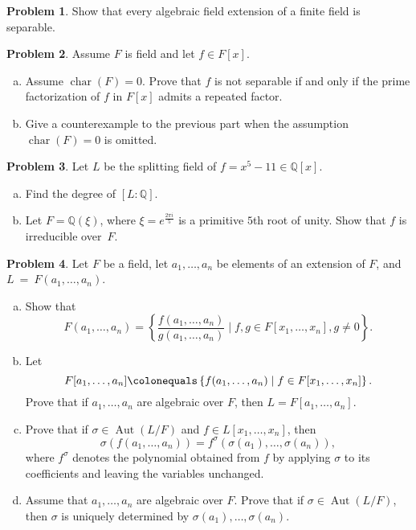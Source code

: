 \documentclass[11pt]{article}
\DeclareMathOperator{\ch}{char}
\DeclareMathOperator{\Aut}{Aut}
\newcommand{\Q}{\mathbb{Q}}
\theoremstyle{definition}
\newtheorem{problem}{Problem}
\begin{document}
\begin{problem}
Show that every algebraic field extension of a finite field is separable.	
\end{problem}


\begin{problem}
Assume $F$ is field and let $f \in F[x]$.
\begin{enumerate}[a)]
\item Assume $\ch(F) = 0$. Prove that $f$ is not separable if and only if the prime factorization of $f$ in $F[x]$ admits a repeated factor.

\item Give a counterexample to the previous part when the assumption $\ch(F) = 0$ is omitted.
\end{enumerate}
\end{problem}




\begin{problem}
	Let $L$ be the splitting field of $f = x^5 - 11 \in \Q[x]$.
	\begin{enumerate}[a)]
		\item Find the degree of $[L : \Q]$.
		\item Let $F = \Q(\xi)$, where $\xi = e^{\frac{2 \pi i}{5}}$ is a primitive $5$th root of unity. Show that $f$ is irreducible over~$F$.
	\end{enumerate}
\end{problem}


\begin{problem}
Let $F$ be a field, let $a_1,\ldots, a_n$ be elements of an extension of $F$, and $L~=~F(a_1, \ldots, a_n)$.

\begin{enumerate}[a)]
\item Show that
$$F(a_1,\ldots,a_n) = \left\{\frac{f(a_1,\ldots, a_n)}{g(a_1,\ldots,a_n)}\mid f,g \in F[x_1,\ldots, x_n], g \neq 0\right\}.$$

\item Let 
$$F[a_1,\ldots,a_n] \colonequals \left\{f(a_1,\ldots, a_n)\mid f \in F[x_1,\ldots, x_n]\right\}.$$ 
Prove that if $a_1,\ldots, a_n$ are algebraic over $F$, then $L=F[a_1,\ldots,a_n]$.

\item Prove that if $\sigma\in\Aut(L/F)$ and $f\in L[x_1, \ldots, x_n]$, then 
$$\sigma(f(a_1,\ldots, a_n)) = f^\sigma(\sigma(a_1),\ldots, \sigma(a_n)),$$
where $f^\sigma$ denotes the polynomial obtained from $f$ by applying $\sigma$ to its coefficients and leaving the variables unchanged.

\item Assume that $a_1, \ldots, a_n$ are algebraic over $F$. Prove that if $\sigma \in \Aut(L/F)$, then $\sigma$ is uniquely determined by $\sigma(a_1),\ldots, \sigma(a_n)$.
\end{enumerate}
\end{problem}
\end{document}
